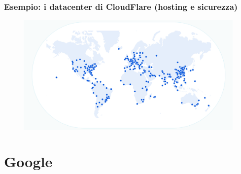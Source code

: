\documentclass[handout]{beamer}
\begin{document}
\begin{frame}
\frametitle{Esempio: i datacenter di CloudFlare (hosting e sicurezza)}
\begin{figure}
  \includegraphics[width=\columnwidth]{img/cloudflarenetwork.png}
\end{figure}
\end{frame}

\section{Google}
\end{document}
